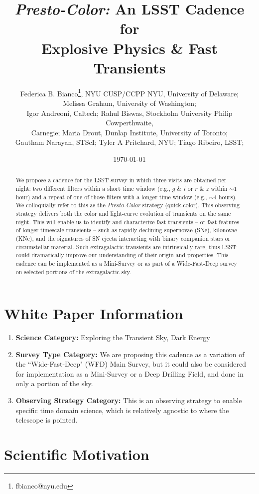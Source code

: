 \documentclass[12pt, letterpaper]{article}
\title{{\em Presto-Color:} An LSST Cadence for \\ Explosive Physics \& Fast Transients}
\author{\small{Federica B. Bianco\footnote{fbianco@nyu.edu}, NYU CUSP/CCPP NYU, University of Delaware;}\\\small{Melissa Graham, University of Washington;}\\\small{Igor Andreoni, Caltech; Rahul Biswas, Stockholm University Philip Cowperthwaite,}\\\small{Carnegie; Maria Drout, Dunlap Institute, University of Toronto;}\\\small{Gautham Narayan, STScI; Tyler A Pritchard, NYU; Tiago Ribeiro, LSST; 
}}
\date{\today}
\begin{document}
\maketitle

\begin{abstract}
We propose a cadence for the LSST survey in which three visits are obtained per night: two different filters within a short time window (e.g., $g$ \& $i$ or $r$ \& $z$ within $\sim1$ hour) and a repeat of one of those filters with a longer time window (e.g., $\sim4$ hours). We colloquially refer to this as the {\em Presto-Color} strategy (quick-color). This observing strategy delivers both the color and light-curve evolution of transients on the same night. This will enable us to identify and characterize fast transients -- or fast features of longer timescale transients -- such as rapidly-declining supernovae (SNe), kilonovae (KNe), and the signatures of SN ejecta interacting with binary companion stars or circumstellar material. Such extragalactic transients are intrinsically rare, thus LSST could dramatically improve our understanding of their origin and properties. This cadence can be implemented as a Mini-Survey or as part of a Wide-Fast-Deep survey on selected portions of the extragalactic sky.
\end{abstract}

\section{White Paper Information}
\begin{enumerate} 
\item {\bf Science Category:} Exploring the Transient Sky, Dark Energy
\item {\bf Survey Type Category:} We are proposing this cadence as a variation of the  ``Wide-Fast-Deep" (WFD) Main Survey, but it could also be considered for implementation as a Mini-Survey or a Deep Drilling Field, and done in only a portion of the sky. 
\item {\bf Observing Strategy Category:} This is an observing strategy to enable specific time domain science, which is relatively agnostic to where the telescope is pointed. 
\end{enumerate}  


\clearpage
\section{Scientific Motivation}
\end{document}
